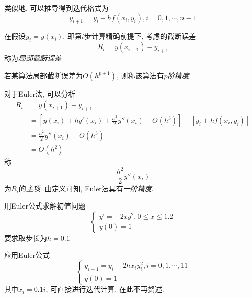 类似地, 可以推导得到迭代格式为
\begin{equation*}
    y_{i+1}=y_i+hf(x_i,y_i), i=0,1,\cdots,n-1
\end{equation*}

\begin{definition}[局部截断误差]
    在假设$y_i=y(x_i)$, 即第$i$步计算精确前提下, 考虑的截断误差
    \begin{equation*}
        R_i=y(x_{i+1})-y_{i+1}
    \end{equation*}
    称为\emph{局部截断误差}
\end{definition}

\begin{definition}
    若某算法局部截断误差为$O(h^{p+1})$, 则称该算法有\emph{$p$阶精度}.
\end{definition}

对于Euler法, 可以分析
\begin{align*}
    R_i&=y(x_{i+1})-y_{i+1}\\
    &=\left[y(x_i)+hy'(x_i)+\frac{h^2}{2}y''(x_i)+O(h^3)\right]-[y_i+hf(x_i,y_i)]\\
    &=\frac{h^2}{2}y''(x_i)+O(h^3)\\
    &=O(h^2)
\end{align*}
称
\begin{equation*}
    \frac{h^2}{2}y''(x_i)
\end{equation*}
为$R_i$的\emph{主项}. 由定义可知, Euler法具有\emph{一阶精度}.

\begin{example}
    用Euler公式求解初值问题
    \begin{equation*}
        \begin{cases}
            y'=-2xy^2, 0\le x\le1.2\\
            y(0)=1
        \end{cases}
    \end{equation*}
    要求取步长为$h=0.1$
\end{example}

\begin{solution}
    应用Euler公式
    \begin{equation*}
        \begin{cases}
            y_{i+1}=y_i-2hx_iy_i^2, i=0,1,\cdots,11\\
            y(0)=1
        \end{cases}
    \end{equation*}
    其中$x_i=0.1i$, 可直接进行迭代计算. 在此不再赘述.
\end{solution}

